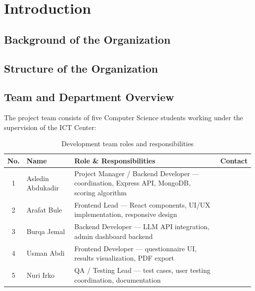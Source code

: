 ﻿\documentclass[12pt, a4paper]{article}
\newcommand{\theadrow}{\rowcolor{tableheader}}
\newcommand{\rowalt}{\rowcolor{tablerowalt}}
\begin{document}
\clearpage

\section{Introduction}

\subsection{Background of the Organization}



\subsection{Structure of the Organization}



\subsection{Team and Department Overview}



The project team consists of five Computer Science students working under the supervision of the ICT Center:

\begin{table}[H]
\centering
\begin{tabularx}{\textwidth}{clXl}
\toprule
\theadrow
\textbf{No.} & \textbf{Name} & \textbf{Role \& Responsibilities} & \textbf{Contact} \\
\midrule
1 & Asledin Abdukadir & Project Manager / Backend Developer --- coordination, Express API, MongoDB, scoring algorithm &  \\[3pt]
\rowalt
2 & Arafat Bule & Frontend Lead --- React components, UI/UX implementation, responsive design &  \\[3pt]
3 & Burqa Jemal & Backend Developer --- LLM API integration, admin dashboard backend &  \\[3pt]
\rowalt
4 & Usman Abdi & Frontend Developer --- questionnaire UI, results visualization, PDF export &  \\[3pt]
5 & Nuri Irko & QA / Testing Lead --- test cases, user testing coordination, documentation &  \\
\bottomrule
\end{tabularx}
\caption{Development team roles and responsibilities}
\end{table}
\end{document}
